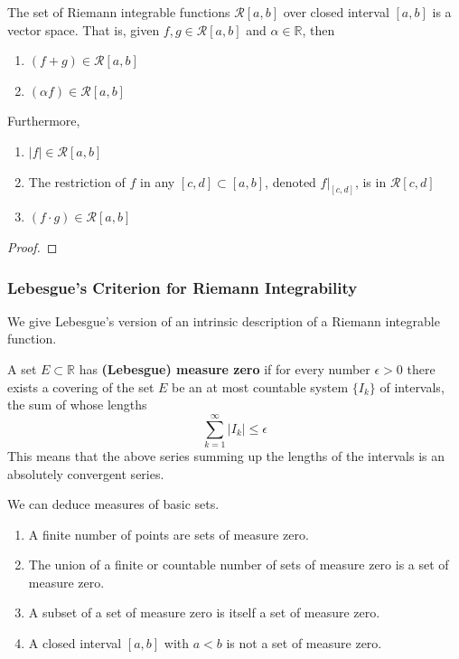 \documentclass{article}
\begin{document}
      \begin{theorem}
      The set of Riemann integrable functions $\mathcal{R}[a, b]$ over closed interval $[a, b]$ is a vector space. That is, given $f, g \in \mathcal{R}[a, b]$ and $\alpha \in \mathbb{R}$, then
      \begin{enumerate}
        \item $(f + g) \in \mathcal{R}[a, b]$ 
        \item $(\alpha f) \in \mathcal{R}[a, b]$
      \end{enumerate}
      Furthermore, 
      \begin{enumerate}
        \item $|f| \in \mathcal{R}[a, b]$
        \item The restriction of $f$ in any $[c, d] \subset [a, b]$, denoted $f \big|_{[c,d]}$, is in $\mathcal{R}[c,d]$
        \item $(f \cdot g) \in \mathcal{R}[a, b]$
      \end{enumerate}
      \end{theorem}
      \begin{proof}

      \end{proof}

      \subsubsection{Lebesgue's Criterion for Riemann Integrability}
      We give Lebesgue's version of an intrinsic description of a Riemann integrable function. 

      \begin{definition}[Measure]
        A set $E \subset \mathbb{R}$ has \textbf{(Lebesgue) measure zero} if for every number $\epsilon > 0$ there exists a covering of the set $E$ be an at most countable system $\{I_k\}$ of intervals, the sum of whose lengths 
        \[\sum_{k=1}^\infty |I_k| \leq \epsilon\]
        This means that the above series summing up the lengths of the intervals is an absolutely convergent series. 
      \end{definition}

      \begin{lemma}
        We can deduce measures of basic sets. 
        \begin{enumerate}
          \item A finite number of points are sets of measure zero. 
          \item The union of a finite or countable number of sets of measure zero is a set of measure zero. \item A subset of a set of measure zero is itself a set of measure zero. 
          \item A closed interval $[a, b]$ with $a<b$ is not a set of measure zero. 
        \end{enumerate}
      \end{lemma}
\end{document}
